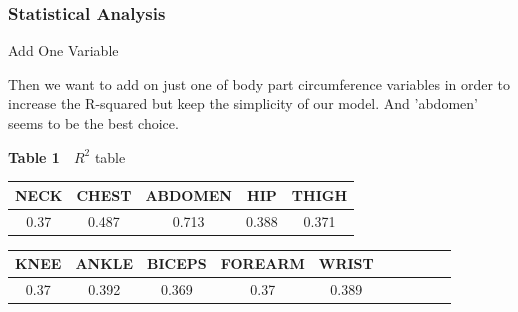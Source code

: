 \documentclass{beamer}
\begin{document}
\begin{frame}
\frametitle{Statistical Analysis}
\begin{block}{Add One Variable}

Then we want to add on just one of body part circumference variables in order to increase the R-squared but keep the simplicity of our model. And 'abdomen' seems to be the best choice.
\end{block}

\begin{center}
\textbf{Table 1}~~$R^2$ table\\

\begin{tabular}{ccccc} \toprule
NECK &	CHEST &	ABDOMEN &	HIP &	THIGH \\ 
\hline
0.37 &	0.487 &	0.713 &	0.388 &	0.371 \\
\bottomrule
\end{tabular}

\begin{tabular}{cccccccccc} \toprule
	KNEE &	ANKLE &	BICEPS &	FOREARM	& WRIST \\ 
\hline
	0.37 &	0.392 &	0.369 &	0.37 &	0.389 \\
\bottomrule
\end{tabular}

\end{center}


\end{frame}
\end{document}
